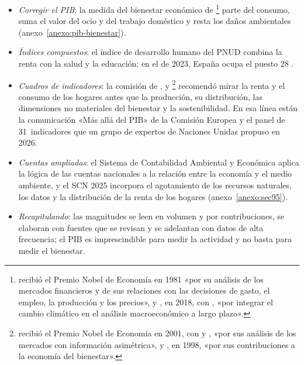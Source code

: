 \documentclass[11pt]{article}
\begin{document}
\begin{itemize}
  \begin{itemize}
  \item \emph{Corregir el PIB}: la medida del bienestar económico de \textcite{NordhausTobin1972Growth}\footnote{ recibió el Premio Nobel de Economía en 1981 «por su análisis de los mercados financieros y de sus relaciones con las decisiones de gasto, el empleo, la producción y los precios»\nocite{Nobel1981Tobin}, y , en 2018, con , «por integrar el cambio climático en el análisis macroeconómico a largo plazo»\nocite{Nobel2018Nordhaus}.} parte del consumo, suma el valor del ocio y del trabajo doméstico y resta los daños ambientales (anexo~\ref{anexo:pib-bienestar}).
  \item \emph{Índices compuestos}: el índice de desarrollo humano del PNUD combina la renta con la salud y la educación; en el de 2023, España ocupa el puesto 28\nocite{PNUD2025IDH} .
  \item \emph{Cuadros de indicadores}: la comisión de ,  y \footnote{ recibió el Premio Nobel de Economía en 2001, con  y , «por sus análisis de los mercados con información asimétrica»\nocite{Nobel2001AkerlofSpenceStiglitz}, y , en 1998, «por sus contribuciones a la economía del bienestar»\nocite{NobelPrize1998}.} recomendó mirar la renta y el consumo de los hogares antes que la producción, su distribución, las dimensiones no materiales del bienestar y la sostenibilidad\nocite{StiglitzSenFitoussi2009}. En esa línea están la comunicación «Más allá del PIB» de la Comisión Europea\nocite{CE2009MasAllaPIB} y el panel de 31~indicadores que un grupo de expertos de Naciones Unidas propuso en 2026\nocite{ONU2026BeyondGDP}.
  \item \emph{Cuentas ampliadas}: el Sistema de Contabilidad Ambiental y Económica aplica la lógica de las cuentas nacionales a la relación entre la economía y el medio ambiente\nocite{ONU2014SCAE}, y el SCN 2025 incorpora el agotamiento de los recursos naturales, los datos y la distribución de la renta de los hogares (anexo~\ref{anexo:sec95}).
  \end{itemize}
\end{itemize}

\begin{itemize}
\item \emph{Recapitulando}: las magnitudes se leen en volumen y por contribuciones, se elaboran con fuentes que se revisan y se adelantan con datos de alta frecuencia; el PIB es imprescindible para medir la actividad y no basta para medir el bienestar.
\end{itemize}
\end{document}
